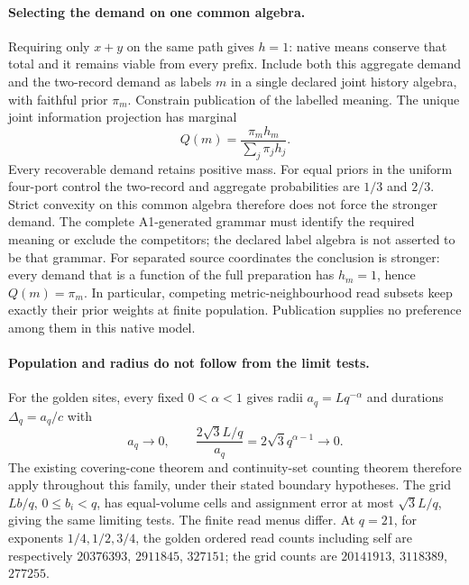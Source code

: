 \paragraph{Selecting the demand on one common algebra.}
Requiring only $x+y$ on the same path gives $h=1$: native means conserve
that total and it remains viable from every prefix. Include both this
aggregate demand and the two-record demand as labels $m$ in a single
declared joint history algebra, with faithful prior $\pi_m$. Constrain
publication of the labelled meaning. The unique joint information
projection has marginal
\[
 Q(m)=\frac{\pi_m h_m}{\sum_j\pi_j h_j}.
\]
Every recoverable demand retains positive mass. For equal priors in the
uniform four-port control the two-record and aggregate probabilities are
$1/3$ and $2/3$. Strict convexity on this common algebra therefore does
not force the stronger demand. The complete A1-generated grammar must
identify the required meaning or exclude the competitors; the declared
label algebra is not asserted to be that grammar.
For separated source coordinates the conclusion is stronger: every demand
that is a function of the full preparation has $h_m=1$, hence $Q(m)=\pi_m$.
In particular, competing metric-neighbourhood read subsets keep exactly
their prior weights at finite population. Publication supplies no preference
among them in this native model.

\paragraph{Population and radius do not follow from the limit tests.}
For the golden sites, every fixed $0<\alpha<1$ gives radii
$a_q=Lq^{-\alpha}$ and durations $\Delta_q=a_q/c$ with
\[
 a_q\longrightarrow0,\qquad
 \frac{2\sqrt3L/q}{a_q}=2\sqrt3q^{\alpha-1}\longrightarrow0.
\]
The existing covering-cone theorem and continuity-set counting theorem
therefore apply throughout this family, under their stated boundary
hypotheses. The grid $Lb/q$, $0\leq b_i<q$, has equal-volume cells and
assignment error at most $\sqrt3L/q$, giving the same limiting tests.
The finite read menus differ. At $q=21$, for exponents $1/4,1/2,3/4$,
the golden ordered read counts including self are respectively
$20376393$, $2911845$, $327151$; the grid counts are
$20141913$, $3118389$, $277255$.

